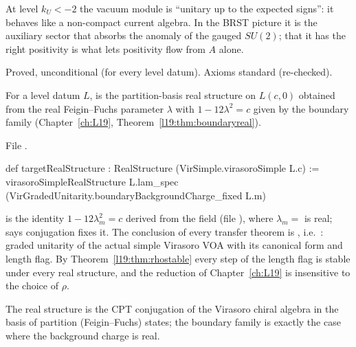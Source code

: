 \begin{physics}
At level $k_U<-2$ the vacuum module is ``unitary up to the expected signs'': it behaves like a non-compact current
algebra. In the BRST picture it is the auxiliary sector that absorbs the anomaly of the gauged $SU(2)$; that it has
the right positivity is what lets positivity flow from $A$ alone.
\end{physics}

\begin{status}
Proved, unconditional (for every level datum). Axioms standard (re-checked).
\end{status}

\begin{definition}\label{l29:def:target}
For a level datum $L$,  is the partition-basis real structure on $L(c,0)$ obtained from the
real Feigin--Fuchs parameter $\lambda$ with $1-12\lambda^2=c$ given by the boundary family (Chapter~\ref{ch:L19},
Theorem~\ref{l19:thm:boundaryreal}).
\end{definition}

\noindent File .
\begin{leancode}
def targetRealStructure : RealStructure (VirSimple.virasoroSimple L.c) :=
  virasoroSimpleRealStructure L.lam_spec (VirGradedUnitarity.boundaryBackgroundCharge_fixed L.m)
\end{leancode}

\begin{dictionary}
 is the identity $1-12\lambda_m^2=c$ derived from the field  (file
), where $\lambda_m=$  is real;  says
conjugation fixes it. The conclusion of every transfer theorem is
, i.e.\ :
graded unitarity of the actual simple Virasoro VOA with its canonical form and length flag. By
Theorem~\ref{l19:thm:rhostable} every step of the length flag is stable under every real structure, and the
reduction of Chapter~\ref{ch:L19} is insensitive to the choice of $\rho$.
\end{dictionary}

\begin{physics}
The real structure is the CPT conjugation of the Virasoro chiral algebra in the basis of partition (Feigin--Fuchs)
states; the boundary family is exactly the case where the background charge is real.
\end{physics}

